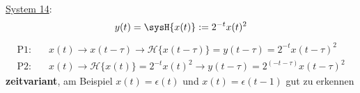 \begin{Loesung}
\item  \underline{System 14}:
\begin{equation}
y(t) = \sysH{x(t)}:= 2^{-t} x(t)^2
\end{equation}
\begin{align}
\text{P1:}& \quad x(t)\rightarrow x(t-\tau)\rightarrow \mathcal{H}\{x(t-\tau)\}=y(t-\tau)=2^{-t} x(t-\tau)^2\\
\text{P2:}& \quad x(t)\rightarrow \mathcal{H}\{x(t)\}=2^{-t} x(t)^2\rightarrow y(t-\tau)=2^{(-t-\tau)} x(t-\tau)^2
\end{align}
\textbf{zeitvariant}, am Beispiel $x(t)=\epsilon(t)$ und $x(t)=\epsilon(t-1)$
gut zu erkennen
\end{Loesung}















\newpage

